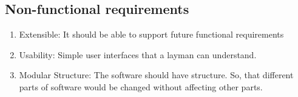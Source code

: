 \subsection{Non-functional requirements}
\begin{enumerate}
    \item Extensible: It should be able to support future functional requirements
    \item Usability: Simple user interfaces that a layman can understand.
    \item Modular Structure: The software should have  structure. So, that different parts of software would be changed without affecting other parts.
\end{enumerate}

